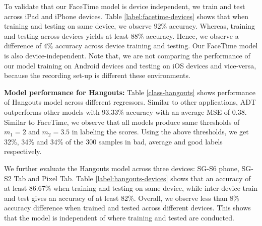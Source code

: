 To validate that our FaceTime model is device independent, we train and test across iPad and iPhone devices.
Table \ref{label:facetime-devices} shows that when training and testing on same device, we observe $92\%$ accuracy. Whereas, training  and testing across devices yields at least $88\%$ accuracy. Hence, we observe a difference of $4\%$ accuracy across device training and testing. Our FaceTime model is also device-independent. Note that, we are not comparing the performance of our model training on Android devices and testing on iOS devices and vice-versa, because the recording set-up is different these environments.

\noindent\textbf{Model performance for Hangouts:} 
Table \ref{class-hangouts} shows performance of Hangouts model across different regressors.
Similar to other applications, ADT outperforms other models with 93.33\% accuracy with an average MSE of 0.38.
Similar to FaceTime, we observe that all models produce same thresholds of $m_1=2$ and $m_2=3.5$ in labeling the scores.
Using the above thresholds, we get 32\%, 34\% and 34\% of the 300 samples in bad, average and good labels respectively.

We further evaluate the Hangouts model across three devices: SG-S6 phone, SG-S2 Tab and Pixel Tab.
Table \ref{label:hangouts-devices} shows that an accuracy of at least 86.67\% when training and testing on same device, while inter-device train and test gives an accuracy of at least 82\%.
Overall, we observe less than 8\% accuracy difference when trained and tested across different devices. This shows that the model is independent of where training and tested are conducted.
